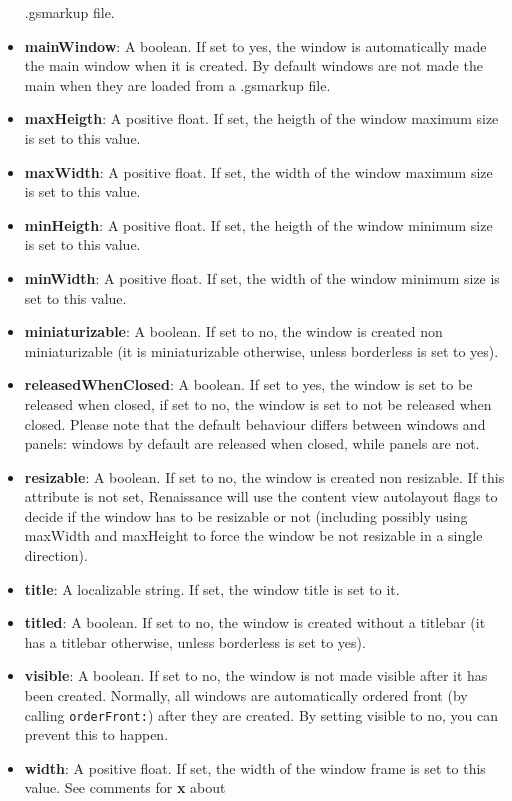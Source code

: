 \begin{itemize}
  .gsmarkup file.
\item {\bf mainWindow}: A boolean.  If set to yes, the window is
  automatically made the main window when it is created.  By default
  windows are not made the main when they are loaded from a .gsmarkup
  file.
\item {\bf maxHeigth}: A positive float.  If set, the heigth of the
  window maximum size is set to this value.
\item {\bf maxWidth}: A positive float.  If set, the width of the
  window maximum size is set to this value.
\item {\bf minHeigth}: A positive float.  If set, the heigth of the
  window minimum size is set to this value.
\item {\bf minWidth}: A positive float.  If set, the width of the
  window minimum size is set to this value.
\item {\bf miniaturizable}: A boolean.  If set to no, the window is
  created non miniaturizable (it is miniaturizable otherwise, unless
  borderless is set to yes).
\item {\bf releasedWhenClosed}: A boolean.  If set to yes, the window
  is set to be released when closed, if set to no, the window is set
  to not be released when closed.  Please note that the default
  behaviour differs between windows and panels: windows by default are
  released when closed, while panels are not.
\item {\bf resizable}: A boolean.  If set to no, the window is created
  non resizable.  If this attribute is not set, Renaissance will use
  the content view autolayout flags to decide if the window has to be
  resizable or not (including possibly using maxWidth and maxHeight to
  force the window be not resizable in a single direction).
\item {\bf title}: A localizable string.  If set, the window title is
  set to it.
\item {\bf titled}: A boolean.  If set to no, the window is created
  without a titlebar (it has a titlebar otherwise, unless borderless
  is set to yes).
\item {\bf visible}: A boolean.  If set to no, the window is not made
  visible after it has been created.  Normally, all windows are
  automatically ordered front (by calling \texttt{orderFront:}) after
  they are created.  By setting visible to no, you can prevent this to
  happen.
\item {\bf width}: A positive float.  If set, the width of the window
  frame is set to this value.  See comments for {\bf x} about

\end{itemize}

